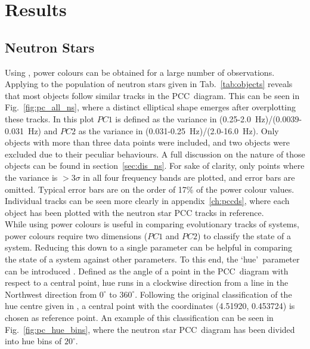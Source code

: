 \chapter{Results}
\label{ch:results}

\section{Neutron Stars}
Using \chromos, power colours can be obtained for a large number of observations. Applying \chromos to the population of neutron stars given in Tab.~\ref{tab:objects} reveals that most objects follow similar tracks in the \ac{PCC}~diagram. This can be seen in Fig.~\ref{fig:pc_all_ns}, where a distinct elliptical shape emerges after overplotting these tracks. In this plot $PC1$ is defined as the variance in (0.25-2.0~Hz)/(0.0039-0.031~Hz) and $PC2$ as the variance in (0.031-0.25~Hz)/(2.0-16.0~Hz). Only objects with more than three data points were included, and two objects were excluded due to their peculiar behaviours. A full discussion on the nature of those objects can be found in section~\ref{sec:dis_ns}. For sake of clarity, only points where the variance is $>\!3 \sigma$ in all four frequency bands are plotted, and error bars are omitted. Typical error bars are on the order of 17\% of the power colour values. Individual tracks can be seen more clearly in appendix~\ref{ch:pccds}, where each object has been plotted with the neutron star \ac{PCC} tracks in reference. \\

While using power colours is useful in comparing evolutionary tracks of systems, power colours require two dimensions ($PC1$ and $PC2$) to classify the state of a system. Reducing this down to a single parameter can be helpful in comparing the state of a system against other parameters. To this end, the `hue'~parameter  can be introduced \citep{heil2015power}. Defined as the angle of a point in the \ac{PCC}~diagram with respect to a central point, hue runs in a clockwise direction from a line in the Northwest direction from $0^\circ$ to $360^\circ$. Following the original classification of the hue centre given in \citet{heil2015power}, a central point with the coordinates (4.51920, 0.453724) is chosen as reference point. An example of this classification can be seen in Fig.~\ref{fig:pc_hue_bins}, where the neutron star \ac{PCC}~diagram has been divided into hue bins of $20^\circ$. \\

